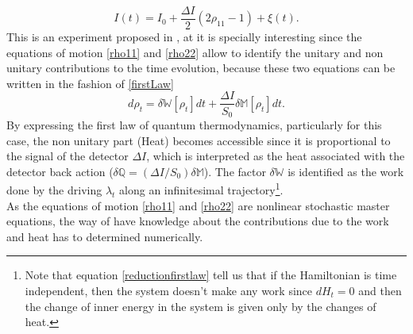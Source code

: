 \begin{equation}
I(t)=I_0 + \frac{\Delta I}{2}(2\rho_{11}-1)+\xi(t).
\label{currentqbit}
\end{equation}
This is an experiment proposed in \cite{2540650509c442d0b14e917fdf7a4ca7}, at it is specially interesting since the equations of motion \eqref{rho11} and \eqref{rho22} allow to identify the  unitary and non unitary contributions to the time evolution, because these two equations can be written in the fashion of \eqref{firstLaw}
\[d\rho_t=\delta\mathbb{W}[\rho_t]dt+\frac{\Delta I}{S_0}\delta\mathbb{M}[\rho_t]dt.\]
By expressing the first law of quantum thermodynamics, particularly for this case, the non unitary part (Heat) becomes accessible since it is proportional to the signal of the detector $\Delta I$, which is interpreted as the heat associated with the detector back action ($\delta\mathbb{Q}=(\Delta I /S_0)\delta\mathbb{M}$). The factor $\delta\mathbb{W}$ is identified as the work done by the driving $\lambda_t$ along an infinitesimal trajectory\footnote{Note that equation \eqref{reductionfirstlaw} tell us that if the Hamiltonian is time independent, then the system doesn't make any work since $dH_{t}=0$ and then the change of inner energy in the system is given only by the changes of heat.}.\\
As the equations of motion \eqref{rho11} and \eqref{rho22} are  nonlinear stochastic master equations, the way of have knowledge about the contributions due to the work and heat has to determined numerically.
 

